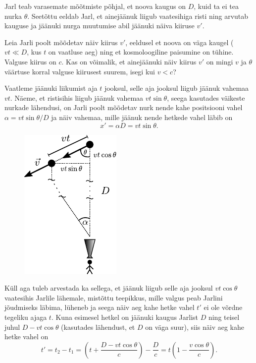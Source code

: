 	Jarl teab varasemate mõõtmiste põhjal, et noova kaugus on $D$, kuid ta ei tea nurka $\theta$. Seetõttu eeldab Jarl, et ainejäänuk liigub vaatesihiga risti ning arvutab kauguse ja jäänuki nurga muutumise abil jäänuki näiva kiiruse $v'$.
	
	Leia Jarli poolt mõõdetav näiv kiirus $v'$, eeldusel et noova on väga kaugel ($vt \ll D$, kus $t$ on vaatluse aeg) ning et kosmoloogiline paisumine on tühine. Valguse kiirus on $c$. Kas on võimalik, et ainejäänuki näiv kiirus $v'$ on mingi $v$ ja $\theta$ väärtuse korral valguse kiirusest suurem, isegi kui $v < c$?
	
	
	
\hint

\solu
Vaatleme jäänuki liikumist aja $t$ jooksul, selle aja jooksul liigub jäänuk vahemaa $vt$. Näeme, et ristisihis liigub jäänuk vahemaa $vt \sin \theta$, seega kasutades väikeste nurkade lähendusi, on Jarli poolt mõõdetav nurk nende kahe positsiooni vahel $\alpha = vt\sin\theta/D$ ja näiv vahemaa, mille jäänuk nende hetkede vahel läbib on
\begin{equation*}
	x' = \alpha D = vt\sin\theta.
\end{equation*}

\begin{figure}[h]
\centering
\includegraphics[width=0.25\linewidth]{2020-lahg-04-sol.pdf}
\end{figure}

Küll aga tuleb arvestada ka sellega, et jäänuk liigub selle aja jooksul $vt \cos\theta$ vaatesihis Jarlile lähemale, mistõttu teepikkus, mille valgus peab Jarlini jõudmiseks läbima, lüheneb ja seega näiv aeg kahe hetke vahel $t'$ ei ole võrdne tegeliku ajaga $t$. Kuna esimesel hetkel on jäänuki kaugus Jarlist $D$ ning teisel juhul $D-vt\cos\theta$ (kasutades lähendust, et $D$ on väga suur), siis näiv aeg kahe hetke vahel on
\begin{equation*}
t' = t_2 - t_1 = \left(t + \frac{D-vt\cos\theta}{c}\right) - \frac{D}{c} = t\left(1 - \frac{v\cos\theta}{c}\right).
\end{equation*}

